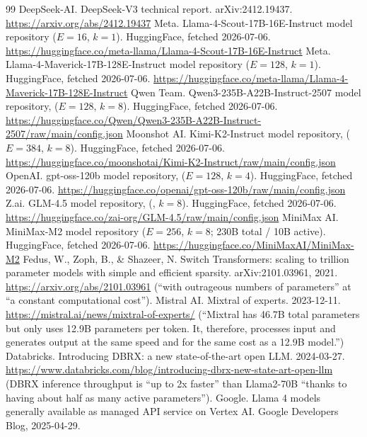 \documentclass[11pt]{article}
\begin{document}
\begin{thebibliography}{99}
 DeepSeek-AI. DeepSeek-V3 technical report. arXiv:2412.19437.
\url{https://arxiv.org/abs/2412.19437}
 Meta. Llama-4-Scout-17B-16E-Instruct model repository
($E{=}16$, $k{=}1$). HuggingFace, fetched 2026-07-06.
\url{https://huggingface.co/meta-llama/Llama-4-Scout-17B-16E-Instruct}
 Meta. Llama-4-Maverick-17B-128E-Instruct model
repository ($E{=}128$, $k{=}1$). HuggingFace, fetched 2026-07-06.
\url{https://huggingface.co/meta-llama/Llama-4-Maverick-17B-128E-Instruct}
 Qwen Team. Qwen3-235B-A22B-Instruct-2507 model repository,
 ($E{=}128$, $k{=}8$). HuggingFace, fetched 2026-07-06.
\url{https://huggingface.co/Qwen/Qwen3-235B-A22B-Instruct-2507/raw/main/config.json}
 Moonshot AI. Kimi-K2-Instruct model repository,
 ($E{=}384$, $k{=}8$). HuggingFace, fetched 2026-07-06.
\url{https://huggingface.co/moonshotai/Kimi-K2-Instruct/raw/main/config.json}
 OpenAI. gpt-oss-120b model repository, 
($E{=}128$, $k{=}4$). HuggingFace, fetched 2026-07-06.
\url{https://huggingface.co/openai/gpt-oss-120b/raw/main/config.json}
 Z.ai. GLM-4.5 model repository, 
(, $k{=}8$). HuggingFace, fetched 2026-07-06.
\url{https://huggingface.co/zai-org/GLM-4.5/raw/main/config.json}
 MiniMax AI. MiniMax-M2 model repository ($E{=}256$,
$k{=}8$; 230B total / 10B active). HuggingFace, fetched 2026-07-06.
\url{https://huggingface.co/MiniMaxAI/MiniMax-M2}
 Fedus, W., Zoph, B., \& Shazeer, N. Switch Transformers:
scaling to trillion parameter models with simple and efficient sparsity.
arXiv:2101.03961, 2021. \url{https://arxiv.org/abs/2101.03961} (``with outrageous numbers of parameters'' at ``a constant computational cost'').
 Mistral AI. Mixtral of experts. 2023-12-11.
\url{https://mistral.ai/news/mixtral-of-experts/} (``Mixtral has 46.7B total
parameters but only uses 12.9B parameters per token. It, therefore, processes
input and generates output at the same speed and for the same cost as a 12.9B
model.'')
 Databricks. Introducing DBRX: a new state-of-the-art open LLM.
2024-03-27.
\url{https://www.databricks.com/blog/introducing-dbrx-new-state-art-open-llm}
(DBRX inference throughput is ``up to 2x faster'' than Llama2-70B ``thanks to having about half as many active parameters'').
 Google. Llama 4 models generally available as managed API
service on Vertex AI. Google Developers Blog, 2025-04-29.

\end{thebibliography}
\end{document}
